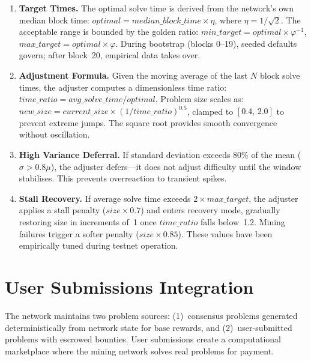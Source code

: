 \documentclass[12pt,letterpaper]{article}
\begin{document}
\begin{enumerate}[label=\alph*.,leftmargin=2em,itemsep=4pt]

\item \textbf{Target Times.} The optimal solve time is derived from the network's own median block time:
$\mathit{optimal} = \mathit{median\_block\_time} \times \eta$, where $\eta = 1/\sqrt{2}$. The
acceptable range is bounded by the golden ratio: $\mathit{min\_target} = \mathit{optimal} \times
\varphi^{-1}$, $\mathit{max\_target} = \mathit{optimal} \times \varphi$. During bootstrap (blocks
0--19), seeded defaults govern; after block~20, empirical data takes over.

\item \textbf{Adjustment Formula.} Given the moving average of the last $N$ block solve times, the
adjuster computes a dimensionless time ratio: $\mathit{time\_ratio} = \mathit{avg\_solve\_time} /
\mathit{optimal}$. Problem size scales as:
$\mathit{new\_size} = \mathit{current\_size} \times (1 / \mathit{time\_ratio})^{0.5}$,
clamped to $[0.4,\, 2.0]$ to prevent extreme jumps. The square root provides smooth convergence
without oscillation.

\item \textbf{High Variance Deferral.} If standard deviation exceeds 80\% of the mean ($\sigma >
0.8\mu$), the adjuster defers---it does not adjust difficulty until the window stabilises. This prevents
overreaction to transient spikes.

\item \textbf{Stall Recovery.} If average solve time exceeds $2 \times \mathit{max\_target}$, the
adjuster applies a stall penalty ($\mathit{size} \times 0.7$) and enters recovery mode, gradually
restoring size in increments of~1 once $\mathit{time\_ratio}$ falls below~1.2. Mining failures trigger a
softer penalty ($\mathit{size} \times 0.85$). These values have been empirically tuned during testnet
operation.

\end{enumerate}

\section{User Submissions Integration}

The network maintains two problem sources: (1)~consensus problems generated deterministically from
network state for base rewards, and (2)~user-submitted problems with escrowed bounties. User
submissions create a computational marketplace where the mining network solves real problems for
payment.
\end{document}
